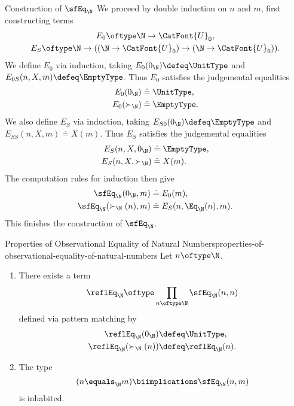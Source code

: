 \begin{Proof}{Construction of $\sfEq_{\N}$}%
    We proceed by double induction on $n$ and $m$, first constructing terms
    \begin{gather*}
        E_{0} \oftype \N\to\CatFont{U}_{0},\\
        E_{S} \oftype \N\to((\N\to\CatFont{U}_{0})\to(\N\to\CatFont{U}_{0})).%
    \end{gather*}
    We define $E_{0}$ via induction, taking $E_{0}(0_{\N})\defeq\UnitType$ and $E_{0S}(n,X,m)\defeq\EmptyType$. Thus $E_{0}$ satisfies the judgemental equalities
    \begin{align*}
        E_{0}(0_{\N})     &\doteq \UnitType,\\%
        E_{0}(\succ_{\N}) &\doteq \EmptyType.%
    \end{align*}
    We also define $E_{S}$ via induction, taking $E_{S0}(0_{\N})\defeq\EmptyType$ and $E_{SS}(n,X,m)\doteq X(m)$. Thus $E_{S}$ satisfies the judgemental equalities
    \begin{align*}
        E_{S}(n,X,0_{\N})     &\doteq \EmptyType,\\%
        E_{S}(n,X,\succ_{\N}) &\doteq X(m).%
    \end{align*}
    The computation rules for induction then give
    \begin{align*}
        \sfEq_{\N}(0_{\N},m)        &\doteq E_{0}(m),\\%
        \sfEq_{\N}(\succ_{\N}(n),m) &\doteq E_{S}(n,\Eq_{\N}(n),m).%
    \end{align*}
    This finishes the construction of $\sfEq_{\N}$.
\end{Proof}
\begin{proposition}{Properties of Observational Equality of Natural Numbers}{properties-of-observational-equality-of-natural-numbers}%
    Let $n\oftype\N$.
    \begin{enumerate}
        \item\label{properties-of-observational-equality-of-natural-numbers-reflexivity}There exists a term
            \[
                \reflEq_{\N}%
                \oftype%
                \prod_{n\oftype\N}\sfEq_{\N}(n,n)%
            \]%
            defined via pattern matching by
            \begin{align*}
                \reflEq_{\N}(0_{\N})        &\defeq \UnitType,\\%
                \reflEq_{\N}(\succ_{\N}(n)) &\defeq \reflEq_{\N}(n).%
            \end{align*}
        \item\label{properties-of-observational-equality-of-natural-numbers-relation-to-identity-types}The type
            \[
                (n\equals_{\N}m)%
                \biimplications%
                \sfEq_{\N}(n,m)%
            \]%
            is inhabited.
    \end{enumerate}
\end{proposition}
